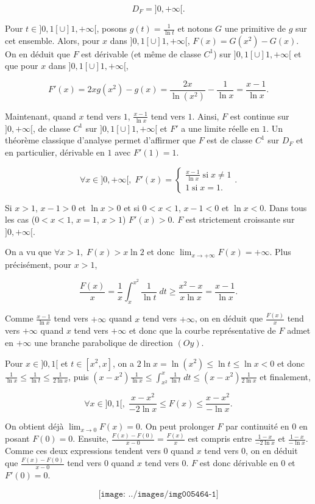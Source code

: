 {{\begin{enumerate}
$$D_F=]0,+\infty[.$$

Pour $t\in]0,1[\cup]1,+\infty[$, posons $g(t)=\frac{1}{\ln t}$ et notons $G$ une primitive de $g$ sur cet ensemble. Alors, pour $x$ dans $]0,1[\cup]1,+\infty[$, $F(x)=G(x^2)-G(x)$. On en déduit que $F$ est dérivable (et même de classe $C^1$) sur $]0,1[\cup]1,+\infty[$ et que pour $x$ dans $]0,1[\cup]1,+\infty[$,

$$F'(x)=2xg(x^2)-g(x)=\frac{2x}{\ln(x^2)}-\frac{1}{\ln x}=\frac{x-1}{\ln x}.$$

Maintenant, quand $x$ tend vers $1$, $\frac{x-1}{\ln x}$ tend vers $1$. Ainsi, $F$ est continue sur $]0,+\infty[$, de classe $C^1$ sur $]0,1[\cup]1,+\infty[$ et $F'$ a une limite réelle en $1$. Un théorème classique d'analyse permet d'affirmer que  $F$ est de classe $C^1$ sur $D_F$ et en particulier, dérivable en $1$ avec $F'(1)=1$.

$$\forall x\in]0,+\infty[,\;F'(x)=\left\{
\begin{array}{l}
\frac{x-1}{\ln x}\;\mbox{si}\;x\neq1\\
1\;\mbox{si}\;x=1.
\end{array}
\right..$$

Si $x>1$, $x-1>0$ et $\ln x>0$ et si $0<x<1$, $x-1<0$ et $\ln x<0$. Dans tous les cas ($0<x<1$, $x=1$, $x>1$)  $F'(x)>0$. $F$ est strictement croissante sur $]0,+\infty[$.

On a vu que $\forall x>1,\;F(x)>x\ln2$ et donc $\lim_{x\rightarrow +\infty}F(x)=+\infty$. Plus précisément, pour $x>1$,

$$\frac{F(x)}{x}=\frac{1}{x}\int_{x}^{x^2}\frac{1}{\ln t}\;dt\geq\frac{x^2-x}{x\ln x}=\frac{x-1}{\ln x}.$$

Comme $\frac{x-1}{\ln x}$ tend vers $+\infty$ quand $x$ tend vers $+\infty$, on en déduit que $\frac{F(x)}{x}$ tend vers $+\infty$ quand $x$ tend vers $+\infty$ et donc que la courbe représentative de $F$ admet en $+\infty$ une branche parabolique de direction $(Oy)$.

Pour $x\in]0,1[$ et $t\in[x^2,x]$, on a $2\ln x=\ln(x^2)\leq\ln t\leq\ln x<0$ et donc $\frac{1}{\ln x}\leq\frac{1}{\ln t}\leq\frac{1}{2\ln x}$, puis $(x-x^2)\frac{1}{\ln x}\leq\int_{x^2}^{x}\frac{1}{\ln t}\;dt\leq(x-x^2)\frac{1}{2\ln x}$ et finalement,

$$\forall x\in]0,1[,\;\frac{x-x^2}{-2\ln x}\leq F(x)\leq\frac{x-x^2}{-\ln x}.$$

On obtient déjà $\lim_{x\rightarrow 0}F(x)=0$. On peut prolonger $F$ par continuité en $0$ en posant $F(0)=0$. Ensuite, $\frac{F(x)-F(0)}{x-0}=\frac{F(x)}{x}$ est compris entre $\frac{1-x}{-2\ln x}$ et $\frac{1-x}{-\ln x}$. Comme ces deux expressions tendent vers $0$ quand $x$ tend vers $0$, on en déduit que $\frac{F(x)-F(0)}{x-0}$ tend vers $0$ quand $x$ tend vers $0$. $F$ est donc dérivable en $0$ et $F'(0)=0$.

$$\texttt{[image: ../images/img005464-1]}$$

\end{enumerate}}
}